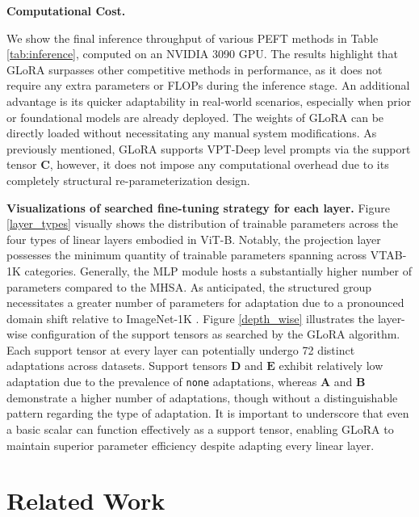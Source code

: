 {\bf Computational Cost.}

We show the final inference throughput of various PEFT methods in Table \ref{tab:inference}, computed on an NVIDIA 3090 GPU. The results highlight that GLoRA surpasses other competitive methods in performance, as it does not require any extra parameters or FLOPs during the inference stage. An additional advantage is its quicker adaptability in real-world scenarios, especially when prior or foundational models are already deployed. The weights of GLoRA can be directly loaded without necessitating any manual system modifications. As previously mentioned, GLoRA supports VPT-Deep level prompts via the support tensor $\mathbf{C}$, however, it does not impose any computational overhead due to its completely structural re-parameterization design.

{\bf Visualizations of searched fine-tuning strategy for each layer.} Figure \ref{layer_types} visually shows the distribution of trainable parameters across the four types of linear layers embodied in ViT-B. Notably, the projection layer possesses the minimum quantity of trainable parameters spanning across VTAB-1K categories. Generally, the MLP module hosts a substantially higher number of parameters compared to the MHSA. As anticipated, the structured group necessitates a greater number of parameters for adaptation due to a pronounced domain shift relative to ImageNet-1K \citep{deng2009imagenet}. Figure \ref{depth_wise} illustrates the layer-wise configuration of the support tensors as searched by the GLoRA algorithm. Each support tensor at every layer can potentially undergo 72 distinct adaptations across datasets. Support tensors $\mathbf{D}$ and $\mathbf{E}$ exhibit relatively low adaptation due to the prevalence of \texttt{none} adaptations, whereas $\mathbf{A}$ and $\mathbf{B}$ demonstrate a higher number of adaptations, though without a distinguishable pattern regarding the type of adaptation. It is important to underscore that even a basic scalar can function effectively as a support tensor, enabling GLoRA to maintain superior parameter efficiency despite adapting every linear layer.

\section{Related Work}

